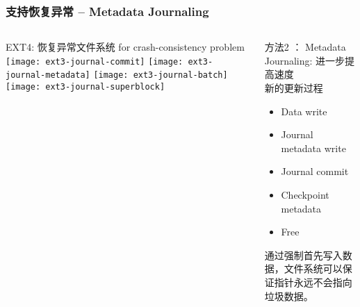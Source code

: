 \begin{frame}[fragile]
	\frametitle{支持恢复异常 -- Metadata Journaling}
	\begin{columns}
		\begin{column}{.5\textwidth}
			EXT4: 恢复异常文件系统 for crash-consistency problem
			\texttt{[image: ext3-journal-commit]}
			\texttt{[image: ext3-journal-metadata]}
			\texttt{[image: ext3-journal-batch]}
			\texttt{[image: ext3-journal-superblock]}
		\end{column}
		\begin{column}{.5\textwidth}			
			方法2 ： Metadata Journaling: 进一步提高速度 \\
			新的更新过程
			\begin{itemize}	
				\item Data write
				\item Journal metadata write
				\item Journal commit
				\item Checkpoint metadata
				\item Free
				
			\end{itemize}
			通过强制首先写入数据，文件系统可以保证指针永远不会指向垃圾数据。
		\end{column}
	\end{columns}
	
\end{frame}



